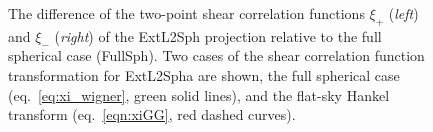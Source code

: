 \documentclass[fleqn,usenatbib]{mnras} %
\begin{document}
\begin{figure}

  \begin{center}
  \end{center}

  \caption{%
    The difference of the two-point shear correlation functions $\xi_+$ (\emph{left}) and $\xi_-$ (\emph{right})
    of the ExtL2Sph projection relative to the full spherical case (FullSph). Two cases of the shear correlation function transformation for
    ExtL2Spha are shown,
    the full spherical case (eq.~\ref{eq:xi_wigner}, green solid lines), and the flat-sky Hankel transform (eq.~\ref{eqn:xiGG}, red dashed curves).
  }

  \label{fig:xi_p_wigner}

\end{figure}
\end{document}
